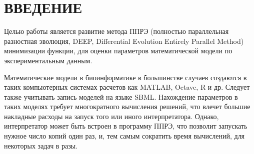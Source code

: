 \chapter*{ВВЕДЕНИЕ}

Целью работы является развитие метода ППРЭ (полностью параллельная разностная эволюция, DEEP, Differential Evolution Entirely Parallel Method) минимизации функции, для оценки параметров математической модели по экспериментальным данным.

Математические модели в биоинформатике в большинстве случаев создаются в таких компьютерных системах расчетов как MATLAB, Octave, R и др. Следует также учитывать запись моделей на языке SBML. Нахождение параметров в таких моделях требует многократного вычисления решений, что влечет большие накладные расходы на запуск того или иного интерпретатора. Однако, интерпретатор может быть встроен в программу ППРЭ, что позволит запускать нужное число копий один раз, и, тем самым сократить время вычислений, для некоторых задач в разы.

